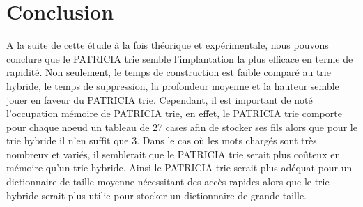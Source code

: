 \documentclass[a4paper,12pt]{report}
\begin{document}
\chapter{Conclusion}
A la suite de cette étude à la fois théorique et expérimentale, nous pouvons conclure que le PATRICIA trie semble l'implantation
la plus efficace en terme de rapidité. Non seulement, le temps de construction est faible comparé au trie hybride, le temps de 
suppression, la profondeur moyenne et la hauteur semble jouer en faveur du PATRICIA trie.
Cependant, il est important de noté l'occupation mémoire de PATRICIA trie, en effet, le PATRICIA trie comporte pour chaque
noeud un tableau de 27 cases afin de stocker ses fils alors que pour le trie hybride il n'en suffit que 3. Dans le cas où 
les mots chargés sont très nombreux et variés, il semblerait que le PATRICIA trie serait plus coûteux en mémoire qu'un trie
hybride.
Ainsi le PATRICIA trie serait plus adéquat pour un dictionnaire de taille moyenne nécessitant des accès rapides alors que le 
trie hybride serait plus utilie pour stocker un dictionnaire de grande taille.
\end{document}
